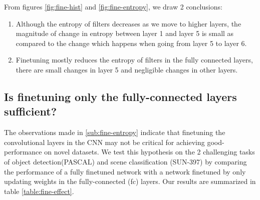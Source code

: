 From figures \ref{fig:fine-hist} and \ref{fig:fine-entropy}, we draw 2 conclusions:
\begin{enumerate}
\item Although the entropy of filters decreases as we move to higher layers, the magnitude of change in entropy between layer 1 and layer 5 is small as compared to the change which happens when going from layer 5 to layer 6.
\item Finetuning mostly reduces the entropy of filters in the fully connected layers, there are small changes in layer 5 and negligible changes in other layers.
\end{enumerate} 

\subsection{Is finetuning only the fully-connected layers sufficient?}
\label{sub:fine-fc-only}
The observations made in \ref{sub:fine-entropy} indicate that finetuning the convolutional layers in the CNN may not be critical for achieving good-performance on novel datasets. We test this hypothesis on the 2 challenging tasks of object detection(PASCAL) and scene classification (SUN-397) by comparing the performance of a fully finetuned network with a network finetuned by only updating weights in the fully-connected (fc) layers. Our results are summarized in table \ref{table:fine-effect}.

\setlength{\tabcolsep}{2pt}
\begin{table}[t!]
\begin{center}
\caption{Comparison in performance on of Alex-Net, Finetuned Network(ft-net) and a network with only fc layers finetuned (fc-ft).}
\label{table:fine-effect}
\end{center}
\end{table}
\setlength{\tabcolsep}{1.4pt}

